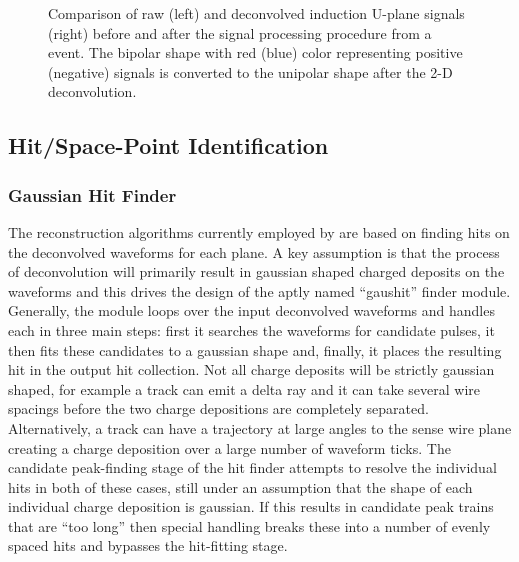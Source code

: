 \begin{figure}[!h!tbp]
\caption{Comparison of raw (left) and deconvolved induction U-plane signals (right) before and after 
the signal processing procedure from a  event. The bipolar shape with red (blue) color representing
positive (negative) signals is converted to the unipolar shape after the 2-D deconvolution. }
\label{pDUNE_sp_example}
\end{figure}


\subsection{Hit/Space-Point Identification}

\subsubsection{Gaussian Hit Finder}
The reconstruction algorithms currently employed by \larsoft are based on finding hits on the deconvolved waveforms for each plane. A key assumption is that the process of deconvolution will primarily result in gaussian shaped charged deposits on the waveforms and this drives the design of the aptly named ``gaushit'' 
 finder module. Generally, the module loops over the input deconvolved waveforms and handles each in three main steps: first it searches the waveforms %
for candidate pulses, it then fits these candidates %
to a gaussian shape and, finally, it places the resulting hit %
in the output hit collection. Not all charge deposits will be strictly gaussian shaped, for example a track can emit a delta ray and it can take several wire spacings before the two charge depositions are %
completely separated. Alternatively, a track can have a trajectory at large angles to the sense wire plane creating a charge deposition over a large number of waveform ticks. The candidate peak-finding stage of the hit finder attempts to resolve the individual hits in both of these cases, still under an assumption that the shape of each individual charge deposition is %
gaussian. If this results in candidate peak trains that are ``too long'' then special handling  breaks these into a number of evenly spaced hits and bypasses the hit-fitting stage. 

